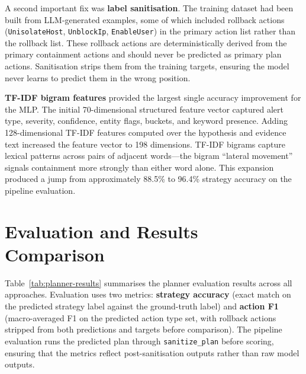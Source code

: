 A second important fix was \textbf{label sanitisation}. The training dataset had been built from LLM-generated examples, some of which included rollback actions (\texttt{UnisolateHost}, \texttt{UnblockIp}, \texttt{EnableUser}) in the primary action list rather than the rollback list. These rollback actions are deterministically derived from the primary containment actions and should never be predicted as primary plan actions. Sanitisation strips them from the training targets, ensuring the model never learns to predict them in the wrong position.

\textbf{TF-IDF bigram features} provided the largest single accuracy improvement for the MLP. The initial 70-dimensional structured feature vector captured alert type, severity, confidence, entity flags, buckets, and keyword presence. Adding 128-dimensional TF-IDF features computed over the hypothesis and evidence text increased the feature vector to 198 dimensions. TF-IDF bigrams capture lexical patterns across pairs of adjacent words---the bigram ``lateral movement'' signals containment more strongly than either word alone. This expansion produced a jump from approximately 88.5\% to 96.4\% strategy accuracy on the pipeline evaluation.

\section{Evaluation and Results Comparison}
\label{sec:eval-comparison}

Table~\ref{tab:planner-results} summarises the planner evaluation results across all approaches. Evaluation uses two metrics: \textbf{strategy accuracy} (exact match on the predicted strategy label against the ground-truth label) and \textbf{action F1} (macro-averaged F1 on the predicted action type set, with rollback actions stripped from both predictions and targets before comparison). The pipeline evaluation runs the predicted plan through \texttt{sanitize\_plan} before scoring, ensuring that the metrics reflect post-sanitisation outputs rather than raw model outputs.

